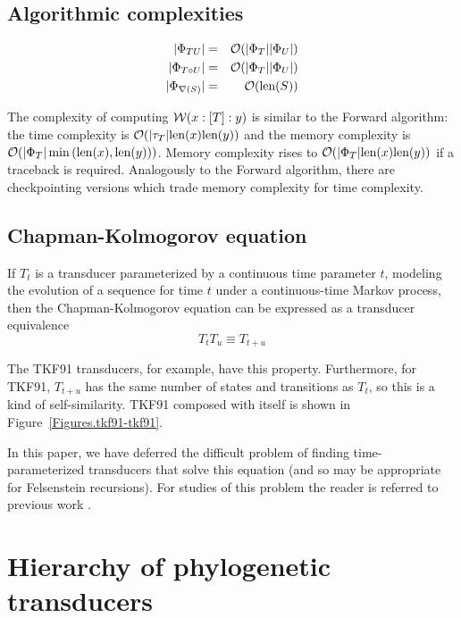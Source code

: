 \documentclass{article}
\newcommand{\seclabel}[1]{\label{sec.#1}}
\newcommand{\figref}[1]{Figure~\ref{Figures.#1}}
\newcommand\wtrans[4]{#1(#2 : [#3] : #4)}
\newcommand\transequiv{\equiv}
\newcommand\compose{}
\newcommand\fork{\circ}
\newcommand\recognize{\nabla}
\newcommand\States{\Phi}
\newcommand\statesof[1]{\States_{#1}}
\newcommand\Transitions{\tau}
\newcommand\transitionsof[1]{\Transitions_{#1}}
\newcommand\weight{{\cal W}}
\newcommand\numberofstates[1]{|\statesof{#1}|}
\newcommand\numberoftransitions[1]{|\transitionsof{#1}|}
\newcommand\seqlen[1]{\mbox{len}(#1)}
\newcommand\order[1]{{\cal O}(#1)}
\begin{document}
\subsection{Algorithmic complexities}
\begin{eqnarray*}
\numberofstates{T \compose U} & = & \order{\numberofstates{T} \numberofstates{U}} \\
\numberofstates{T \fork U} & = & \order{\numberofstates{T} \numberofstates{U}} \\
\numberofstates{\recognize(S)} & = & \order{\seqlen{S}}
\end{eqnarray*}

The complexity of computing $\wtrans{\weight}{x}{T}{y}$ is similar to the Forward algorithm:
the time complexity is $\order{\numberoftransitions{T} \seqlen{x} \seqlen{y}}$ and
the memory complexity is $\order{\numberofstates{T} \min\left(\seqlen{x},\seqlen{y}\right)}$.
Memory complexity rises to $\order{\numberofstates{T} \seqlen{x} \seqlen{y}}$ if a traceback is required.
Analogously to the Forward algorithm, there are checkpointing versions which trade memory complexity for time complexity.


\subsection{Chapman-Kolmogorov equation}
\seclabel{ChapmanKolmogorov}

If $T_t$ is a transducer parameterized by a continuous time parameter $t$,
modeling the evolution of a sequence for time $t$ under a continuous-time Markov process,
then the Chapman-Kolmogorov equation \cite{KarlinTaylor75} can be expressed as a transducer equivalence
\[
T_t \compose T_u \transequiv T_{t+u}
\]

The TKF91 transducers, for example, have this property.
Furthermore, for TKF91, $T_{t+u}$ has the same number of states and transitions as $T_t$,
so this is a kind of self-similarity.
TKF91 composed with itself is shown in \figref{tkf91-tkf91}. 

In this paper, we have deferred the difficult problem of finding time-parameterized transducers that solve this equation
(and so may be appropriate for Felsenstein recursions).
For studies of this problem the reader is referred to previous work \cite{ThorneEtal91,ThorneEtal92,KnudsenMiyamoto2003,MiklosLunterHolmes2004,Rivas05}.

\section{Hierarchy of phylogenetic transducers}
\seclabel{Hierarchy}
\end{document}
